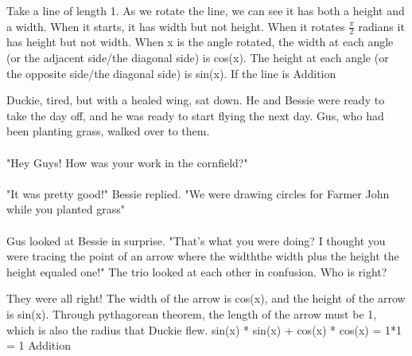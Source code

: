\documentclass[a4paper,11pt ]{book}
\begin{document}
 {}
 {Take a line of length 1. As we rotate the line, we can see it has both a height and a width. When it starts, it has width but not height. When it rotates $\frac{\pi}{2}$ radians it has height but not width. When x is the angle rotated, the width at each angle (or the adjacent side/the diagonal side) is cos(x). The height at each angle (or the opposite side/the diagonal side) is sin(x). If the line is}
 {Addition}
 {Duckie, tired, but with a healed wing, sat down. He and Bessie were ready to take the day off, and he was ready to start flying the next day. Gus, who had been planting grass, walked over to them. 
 \paragraph{} "Hey Guys! How was your work in the cornfield?"
 \paragraph{} "It was pretty good!" Bessie replied. "We were drawing circles for Farmer John while you planted grass"
 \paragraph{} Gus looked at Bessie in surprise. "That's what you were doing? I thought you were tracing the point of an arrow where the width\texttimes the width plus the height \texttimes the height equaled one!"
 The trio looked at each other in confusion. Who is right?}
 {They were all right! The width of the arrow is cos(x), and the height of the arrow is sin(x). Through pythagorean theorem, the length of the arrow must be 1, which is also the radius that Duckie flew.}
 {sin(x) * sin(x) + cos(x) * cos(x) = 1*1 = 1}
 {Addition}
\end{document}
